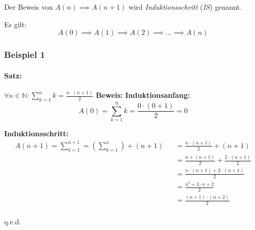 \documentclass[12pt]{scrreprt}
\newcommand{\theorem}[1]{\paragraph{Satz:} #1\newline}
\newenvironment{proof}
    {\textbf{Beweis:}\newline\indent}
    {\begin{flushright}q.e.d.\end{flushright}}
\begin{document}
                Der Beweis von $ A(n) \implies A(n + 1) $ wird \textit{Induktionsschritt} (\textit{IS}) genannt.

                Es gilt: \[ A(0) \implies A(1) \implies A(2) \implies \dots \implies A(n) \]

                \subsubsection{Beispiel 1}
                    \theorem{$ \forall n \in \mathbb{N} : \sum _ { k = 1 } ^ n k = \frac{n \cdot (n + 1)}{2} $}
                        \begin{proof}
                            \textbf{Induktionsanfang:} \[ A(0) = \sum _ { k = 1 } ^ 0 k = \frac{0 \cdot (0 + 1)}{2} = 0 \]

                            \textbf{Induktionsschritt:} 
                            \begin{eqnarray*}
                                A(n + 1) = \sum _ { k = 1 } ^ { n + 1 } = (\sum _ { k = 1 } ^ n) + (n + 1)
                                    && = \frac{n \cdot (n + 1)}{2} + (n + 1)                                \\
                                    && = \frac{n + (n + 1)}{2} + \frac{2 \cdot (n + 1)}{2}                  \\
                                    && = \frac{n \cdot (n + 1) + 2 \cdot (n + 1)}{2}                        \\
                                    && = \frac{n ^ 2 + 3 \cdot n + 2}{2}                                    \\
                                    && = \frac{(n + 1) \cdot (n + 2)}{2}                                    \\
                            \end{eqnarray*}
                        \end{proof}
\end{document}
